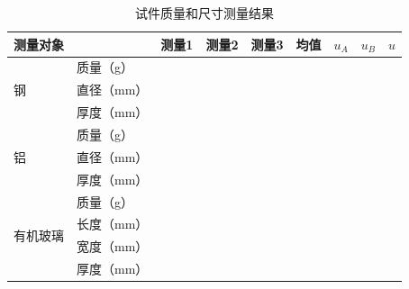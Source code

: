 \documentclass[UTF8,a4paper,12pt]{ctexart}
\newcommand{\blank}[1][2.5cm]{\mbox{\underline{\hspace{#1}}}}
\numberwithin{equation}{section}
\begin{document}
\begin{table}[H]
\centering\scriptsize
\caption{试件质量和尺寸测量结果}
\label{tab:exp2-density}
\setlength{\tabcolsep}{3pt}
\begin{tabular}{llccccccc}
\toprule
\multicolumn{2}{l}{测量对象} & 测量1 & 测量2 & 测量3 & 均值 & $u_A$ & $u_B$ & $u$\\
\midrule
\multirow{3}{*}{钢} & 质量（g） & \blank[0.7cm] & \blank[0.7cm] & \blank[0.7cm] & \blank[0.7cm] & \blank[0.7cm] & \blank[0.7cm] & \blank[0.7cm]\\
 & 直径（mm） & \blank[0.7cm] & \blank[0.7cm] & \blank[0.7cm] & \blank[0.7cm] & \blank[0.7cm] & \blank[0.7cm] & \blank[0.7cm]\\
 & 厚度（mm） & \blank[0.7cm] & \blank[0.7cm] & \blank[0.7cm] & \blank[0.7cm] & \blank[0.7cm] & \blank[0.7cm] & \blank[0.7cm]\\
\midrule
\multirow{3}{*}{铝} & 质量（g） & \blank[0.7cm] & \blank[0.7cm] & \blank[0.7cm] & \blank[0.7cm] & \blank[0.7cm] & \blank[0.7cm] & \blank[0.7cm]\\
 & 直径（mm） & \blank[0.7cm] & \blank[0.7cm] & \blank[0.7cm] & \blank[0.7cm] & \blank[0.7cm] & \blank[0.7cm] & \blank[0.7cm]\\
 & 厚度（mm） & \blank[0.7cm] & \blank[0.7cm] & \blank[0.7cm] & \blank[0.7cm] & \blank[0.7cm] & \blank[0.7cm] & \blank[0.7cm]\\
\midrule
\multirow{4}{*}{有机玻璃} & 质量（g） & \blank[0.7cm] & \blank[0.7cm] & \blank[0.7cm] & \blank[0.7cm] & \blank[0.7cm] & \blank[0.7cm] & \blank[0.7cm]\\
 & 长度（mm） & \blank[0.7cm] & \blank[0.7cm] & \blank[0.7cm] & \blank[0.7cm] & \blank[0.7cm] & \blank[0.7cm] & \blank[0.7cm]\\
 & 宽度（mm） & \blank[0.7cm] & \blank[0.7cm] & \blank[0.7cm] & \blank[0.7cm] & \blank[0.7cm] & \blank[0.7cm] & \blank[0.7cm]\\
 & 厚度（mm） & \blank[0.7cm] & \blank[0.7cm] & \blank[0.7cm] & \blank[0.7cm] & \blank[0.7cm] & \blank[0.7cm] & \blank[0.7cm]\\
\bottomrule
\end{tabular}
\end{table}
\end{document}
